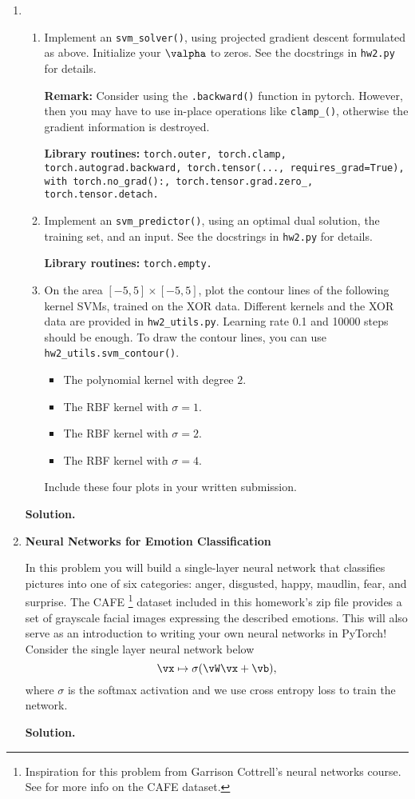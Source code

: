 \documentclass{article}
\theoremstyle{definition}
\theoremstyle{remark}
\newenvironment{Q}
{%
\clearpage
\item
}
{%
\phantom{s}%
\bigskip%
\noindent\textbf{Solution.}
}
\begin{document}
\begin{enumerate}[font={\Large\bfseries},left=0pt]
\begin{Q}
\begin{enumerate}
        \item Implement an \texttt{svm\_solver()}, using projected gradient descent formulated as above. Initialize your $\valpha$ to zeros. See the docstrings in \texttt{hw2.py} for details.
        
    \textbf{Remark:} Consider using the \texttt{.backward()} function in pytorch. However, then you may have to use in-place operations like \texttt{clamp\_()}, otherwise the gradient information is destroyed.
    
    \textbf{Library routines:} \texttt{torch.outer, torch.clamp, torch.autograd.backward, torch.tensor(..., requires\_grad=True), with torch.no\_grad():, torch.tensor.grad.zero\_, torch.tensor.detach.}

        \item Implement an \texttt{svm\_predictor()}, using an optimal dual solution, the training set, and an input. See the docstrings in \texttt{hw2.py} for details.
        
        \textbf{Library routines:} \texttt{torch.empty.}

        \item On the area $[-5,5]\times[-5,5]$, plot the contour lines of the following kernel SVMs, trained on the XOR data. Different kernels and the XOR data are provided in \texttt{hw2\_utils.py}. Learning rate 0.1 and 10000 steps should be enough. To draw the contour lines, you can use \texttt{hw2\_utils.svm\_contour()}.
        \begin{itemize}
            \item The polynomial kernel with degree $2$.
            \item The RBF kernel with $\sigma=1$.
            \item The RBF kernel with $\sigma=2$.
            \item The RBF kernel with $\sigma=4$.
        \end{itemize}
        Include these four plots in your written submission.
    \end{enumerate}
\end{Q}
    
\begin{Q}
    \textbf{\Large Neural Networks for Emotion Classification}
    
    In this problem you will build a single-layer neural network that classifies pictures into one of six categories: anger, disgusted, happy, maudlin, fear, and surprise.  The CAFE \footnote{Inspiration for this problem from Garrison Cottrell's neural networks course. See \cite{cafe} for more info on the CAFE dataset.} dataset included in this homework's zip file provides a set of grayscale facial images expressing the described emotions. This will also serve as an introduction to writing your own neural networks in PyTorch!  Consider the single layer neural network below
    \begin{equation*}
        \vx \mapsto  \sigma(\vW \vx  + \vb),
    \end{equation*}
    where $\sigma$ is the softmax activation and we use cross entropy loss to train the network.
    

\end{Q}
\end{enumerate}
\end{document}

